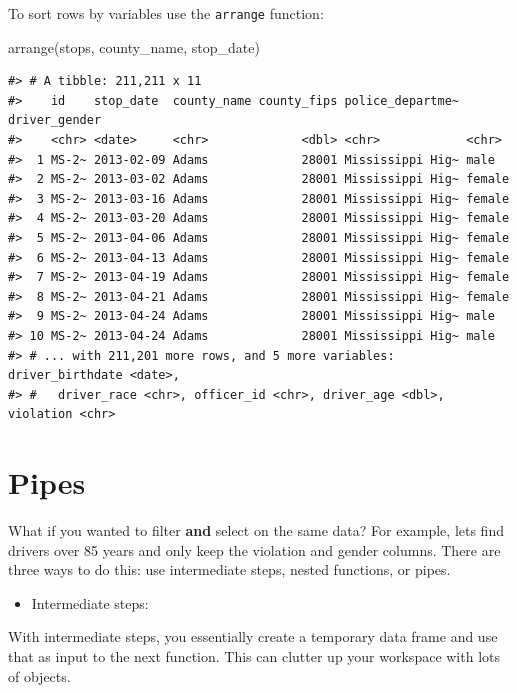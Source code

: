 \documentclass[
]{book}
\newenvironment{Shaded}{\begin{snugshade}}{\end{snugshade}}
\newcommand{\FunctionTok}[1]{\textcolor[rgb]{0.00,0.00,0.00}{#1}}
\newcommand{\NormalTok}[1]{#1}
\providecommand{\tightlist}{%
  \setlength{\itemsep}{0pt}\setlength{\parskip}{0pt}}
\begin{document}
To sort rows by variables use the \texttt{arrange} function:

\begin{Shaded}
\begin{Highlighting}[]
\FunctionTok{arrange}\NormalTok{(stops, county\_name, stop\_date)}
\end{Highlighting}
\end{Shaded}

\begin{verbatim}
#> # A tibble: 211,211 x 11
#>    id    stop_date  county_name county_fips police_departme~ driver_gender
#>    <chr> <date>     <chr>             <dbl> <chr>            <chr>        
#>  1 MS-2~ 2013-02-09 Adams             28001 Mississippi Hig~ male         
#>  2 MS-2~ 2013-03-02 Adams             28001 Mississippi Hig~ female       
#>  3 MS-2~ 2013-03-16 Adams             28001 Mississippi Hig~ female       
#>  4 MS-2~ 2013-03-20 Adams             28001 Mississippi Hig~ female       
#>  5 MS-2~ 2013-04-06 Adams             28001 Mississippi Hig~ female       
#>  6 MS-2~ 2013-04-13 Adams             28001 Mississippi Hig~ female       
#>  7 MS-2~ 2013-04-19 Adams             28001 Mississippi Hig~ female       
#>  8 MS-2~ 2013-04-21 Adams             28001 Mississippi Hig~ female       
#>  9 MS-2~ 2013-04-24 Adams             28001 Mississippi Hig~ male         
#> 10 MS-2~ 2013-04-24 Adams             28001 Mississippi Hig~ male         
#> # ... with 211,201 more rows, and 5 more variables: driver_birthdate <date>,
#> #   driver_race <chr>, officer_id <chr>, driver_age <dbl>, violation <chr>
\end{verbatim}

\hypertarget{pipes}{%
\section{Pipes}\label{pipes}}

What if you wanted to filter \textbf{and} select on the same data? For example, lets find drivers over 85 years and only keep the violation and gender columns. There are three ways to do this: use intermediate steps, nested functions, or pipes.

\begin{itemize}
\tightlist
\item
  Intermediate steps:
\end{itemize}

With intermediate steps, you essentially create a temporary data frame and use
that as input to the next function. This can clutter up your workspace with lots
of objects.
\end{document}
